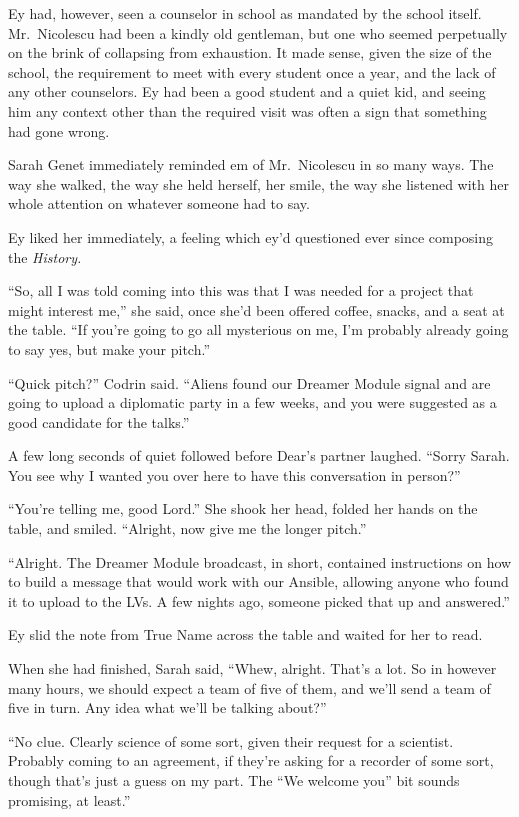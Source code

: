 Ey had, however, seen a counselor in school as mandated by the school itself. Mr.~Nicolescu had been a kindly old gentleman, but one who seemed perpetually on the brink of collapsing from exhaustion. It made sense, given the size of the school, the requirement to meet with every student once a year, and the lack of any other counselors. Ey had been a good student and a quiet kid, and seeing him any context other than the required visit was often a sign that something had gone wrong.

Sarah Genet immediately reminded em of Mr.~Nicolescu in so many ways. The way she walked, the way she held herself, her smile, the way she listened with her whole attention on whatever someone had to say.

Ey liked her immediately, a feeling which ey'd questioned ever since composing the \emph{History.}

``So, all I was told coming into this was that I was needed for a project that might interest me,'' she said, once she'd been offered coffee, snacks, and a seat at the table. ``If you're going to go all mysterious on me, I'm probably already going to say yes, but make your pitch.''

``Quick pitch?'' Codrin said. ``Aliens found our Dreamer Module signal and are going to upload a diplomatic party in a few weeks, and you were suggested as a good candidate for the talks.''

A few long seconds of quiet followed before Dear's partner laughed. ``Sorry Sarah. You see why I wanted you over here to have this conversation in person?''

``You're telling me, good Lord.'' She shook her head, folded her hands on the table, and smiled. ``Alright, now give me the longer pitch.''

``Alright. The Dreamer Module broadcast, in short, contained instructions on how to build a message that would work with our Ansible, allowing anyone who found it to upload to the LVs. A few nights ago, someone picked that up and answered.''

Ey slid the note from True Name across the table and waited for her to read.

When she had finished, Sarah said, ``Whew, alright. That's a lot. So in however many hours, we should expect a team of five of them, and we'll send a team of five in turn. Any idea what we'll be talking about?''

``No clue. Clearly science of some sort, given their request for a scientist. Probably coming to an agreement, if they're asking for a recorder of some sort, though that's just a guess on my part. The ``We welcome you'' bit sounds promising, at least.''

